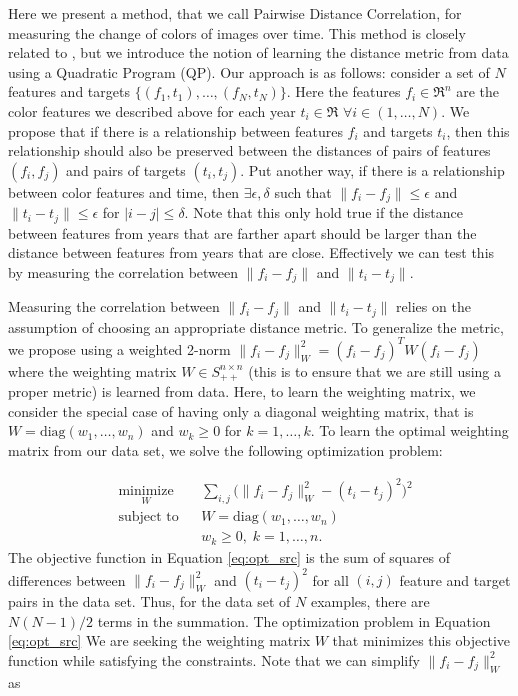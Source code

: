\documentclass[letterpaper]{article}
\begin{document}
Here we present a method, that we call Pairwise Distance Correlation, for measuring the change of colors of images over time. This method is closely related to \cite{lamport94}, but we introduce the notion of learning the distance metric from data using a Quadratic Program (QP). Our approach is as follows: consider a set of $N$ features and targets $\{ (f_{1}, t_{1}), \ldots, (f_{N}, t_{N})\}$. Here the features $f_{i} \in \Re^{n}$ are the color features we described above for each year $t_{i} \in \Re$ $\forall i \in (1, \ldots, N)$. We propose that if there is a relationship between features $f_{i}$ and targets $t_{i}$, then this relationship should also be preserved between the distances of pairs of features $(f_{i}, f_{j})$ and pairs of targets $(t_{i}, t_{j})$. Put another way, if there is a relationship between color features and time, then $\exists \epsilon, \delta$ such that $\|f_{i} - f_{j} \| \le \epsilon$ and $\|t_{i} - t_{j}\| \le \epsilon$ for $|i - j| \le \delta$. Note that this only hold true if the distance between features from years that are farther apart should be larger than the distance between features from years that are close. Effectively we can test this by measuring the correlation between $\|f_{i} - f_{j}\|$ and $\|t_{i} - t_{j}\|$.

Measuring the correlation between $\|f_{i} - f_{j}\|$ and $\|t_{i} - t_{j}\|$ relies on the assumption of choosing an appropriate distance metric. To generalize the metric, we propose using a weighted 2-norm $\|f_{i} - f_{j}\|^{2}_{W} = (f_{i} - f_{j})^{T}W(f_{i} - f_{j})$ where the weighting matrix $W \in S_{++}^{n \times n}$ (this is to ensure that we are still using a proper metric) is learned from data. Here, to learn the weighting matrix, we consider the special case of having only a diagonal weighting matrix, that is $W = \text{diag}(w_{1}, \ldots, w_{n})$ and $w_{k} \ge 0$ for $k = 1, \ldots, k$. To learn the optimal weighting matrix from our data set, we solve the following optimization problem:

\begin{equation} \label{eq:opt_src} 
\begin{aligned}
& \underset{W}{\text{minimize}} & & \sum_{i,j} \big(\|f_{i} - f_{j}\|^{2}_{W} - (t_{i} - t_{j})^{2}\big)^{2}  \\
& \text{subject to} & & W = \text{diag}(w_{1}, \ldots, w_{n}) \\
& & & w_{k} \ge 0, \; k = 1, \ldots, n.
\end{aligned}
\end{equation}
The objective function in Equation \ref{eq:opt_src} is the sum of squares of differences between $\|f_{i} - f_{j}\|^{2}_{W}$ and $(t_{i} - t_{j})^{2}$ for all $(i,j)$ feature and target pairs in the data set. Thus, for the data set of $N$ examples, there are $N(N-1)/2$ terms in the summation. The optimization problem in Equation \ref{eq:opt_src} We are seeking the weighting matrix $W$ that minimizes this objective function while satisfying the constraints. Note that we can simplify $\|f_{i} - f_{j}\|^{2}_{W}$ as
\end{document}

